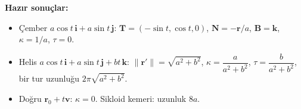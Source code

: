 \begin{ozet}
\textbf{Hazır sonuçlar:}
\begin{itemize}
\item Çember $a\cos t\,\mathbf i+a\sin t\,\mathbf j$: $\mathbf T=(-\sin t,\cos t,0)$, $\mathbf N=-\mathbf r/a$, $\mathbf B=\mathbf k$, $\kappa=1/a$, $\tau=0$.
\item Helis $a\cos t\,\mathbf i+a\sin t\,\mathbf j+bt\,\mathbf k$: $\|\mathbf r'\|=\sqrt{a^2+b^2}$, $\kappa=\dfrac{a}{a^2+b^2}$,
$\tau=\dfrac{b}{a^2+b^2}$, bir tur uzunluğu $2\pi\sqrt{a^2+b^2}$.
\item Doğru $\mathbf r_0+t\mathbf v$: $\kappa=0$. \quad Sikloid kemeri: uzunluk $8a$.
\end{itemize}
\end{ozet}
